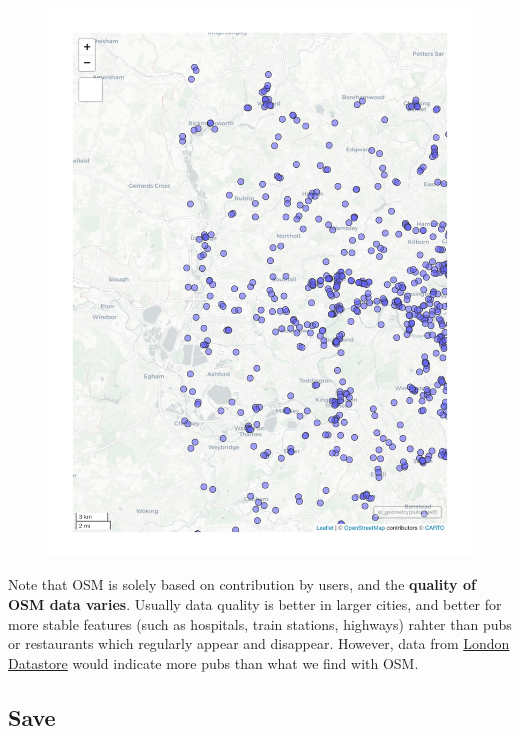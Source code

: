 \documentclass[
  letterpaper,
]{scrbook}
\begin{document}
\begin{figure}[H]

{\centering \includegraphics{01_refresher_files/figure-pdf/unnamed-chunk-21-1.pdf}

}

\end{figure}

Note that OSM is solely based on contribution by users, and the
\textbf{quality of OSM data varies}. Usually data quality is better in
larger cities, and better for more stable features (such as hospitals,
train stations, highways) rahter than pubs or restaurants which
regularly appear and disappear. However, data from
\href{https://data.london.gov.uk/dataset/cultural-infrastructure-map}{London
Datastore} would indicate more pubs than what we find with OSM.

\hypertarget{save}{%
\subsection{Save}\label{save}}
\end{document}
